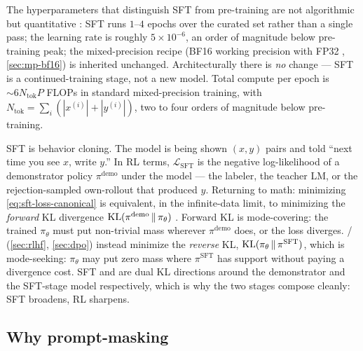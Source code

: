 The hyperparameters that distinguish SFT from pre-training are not
algorithmic but quantitative
\citep[\S 3.5]{ouyang2022-instructgpt}: SFT runs $1$--$4$ epochs over
the curated set rather than a single pass; the learning rate is roughly
$5 \times 10^{-6}$, an order of magnitude below pre-training peak; the
mixed-precision recipe (BF16 working precision with FP32 ,
\cref{sec:mp-bf16}) is inherited unchanged. Architecturally there is
\emph{no} change — SFT is a continued-training stage, not a new model.
Total compute per epoch is $\sim 6 N_{\mathrm{tok}} P$ FLOPs in standard
mixed-precision training, with $N_{\mathrm{tok}} = \sum_i (|x^{(i)}| +
|y^{(i)}|)$, two to four orders of magnitude below pre-training.

\begin{intuition}
SFT is behavior cloning. The model is being shown $(x, y)$ pairs and
told ``next time you see $x$, write $y$.'' In RL terms,
$\mathcal{L}_{\mathrm{SFT}}$ is the negative log-likelihood of a
demonstrator policy $\pi^{\mathrm{demo}}$ under the model — the
labeler, the teacher LM, or the rejection-sampled own-rollout that
produced $y$. Returning to math: minimizing \cref{eq:sft-loss-canonical}
is equivalent, in the infinite-data limit, to minimizing the
\emph{forward} KL divergence
$\operatorname{KL}(\pi^{\mathrm{demo}} \,\|\, \pi_\theta)$
\citep[\S 3.5]{ouyang2022-instructgpt}. Forward KL is mode-covering:
the trained $\pi_\theta$ must put non-trivial mass wherever
$\pi^{\mathrm{demo}}$ does, or the loss diverges.  / 
(\cref{sec:rlhf}, \cref{sec:dpo}) instead minimize the \emph{reverse}
KL, $\operatorname{KL}(\pi_\theta \,\|\, \pi^{\mathrm{SFT}})$, which is mode-seeking:
$\pi_\theta$ may put zero mass where $\pi^{\mathrm{SFT}}$ has support
without paying a divergence cost. SFT and  are dual KL directions
around the demonstrator and the SFT-stage model respectively, which
is why the two stages compose cleanly: SFT broadens, RL sharpens.
\end{intuition}

\subsection{Why prompt-masking}
\label{sec:sft-mask}

